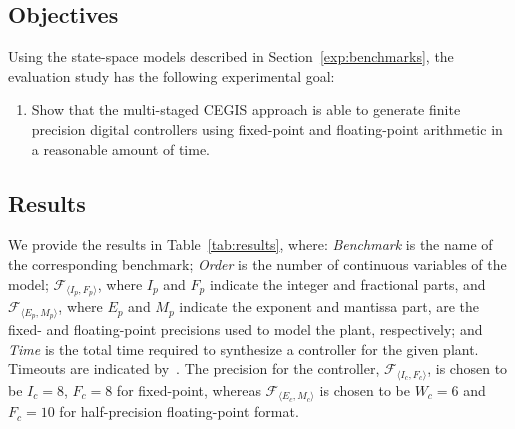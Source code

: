  
\subsection{Objectives}
\label{exp:objectives}

Using the state-space models described in Section~\ref{exp:benchmarks}, 
the evaluation study has the following experimental goal:  
\begin{enumerate}
\item[] 
Show that the multi-staged 
CEGIS approach is able to generate finite precision digital controllers using fixed-point and floating-point arithmetic in a reasonable amount of time.
\end{enumerate}

\subsection{Results}
\label{exp:results}

We provide the results in Table~\ref{tab:results}, where: 
\textit{Benchmark} is the name of the corresponding benchmark; 
\textit{Order} is the number of continuous variables of the model; 
$\mathcal{F}_{\langle I_p,F_p \rangle}$, where $I_p$ and $F_p$ indicate the integer and fractional parts,  
and $\mathcal{F}_{\langle E_p,M_p \rangle}$, where $E_p$ and $M_p$ indicate the exponent and mantissa part, 
are the fixed- and floating-point precisions used to model the plant, respectively; 
and \textit{Time} is the total time required to synthesize a controller for the given plant.    
Timeouts  are indicated by~\xmark.  
The precision for the controller, $\mathcal{F}_{\langle I_c,F_c \rangle}$, is
chosen to be $I_c = 8$, $F_c = 8$ for fixed-point, whereas  
$\mathcal{F}_{\langle E_c, M_c \rangle}$ is chosen to be $W_c = 6$ and $F_c = 10$
for half-precision floating-point format.

